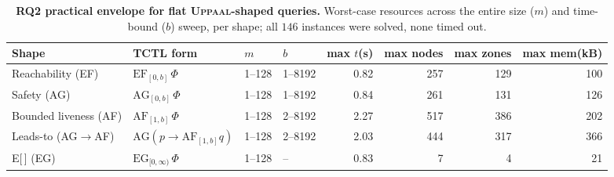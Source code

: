 \begin{table}[t]\centering
\caption{\textbf{RQ2 practical envelope for flat \textsc{Uppaal}-shaped queries.} Worst-case resources across the entire size ($m$) and time-bound ($b$) sweep, per shape; all $146$ instances were solved, none timed out.}\label{tab:perf-rq2}
\small\setlength{\tabcolsep}{5pt}
\begin{tabular}{llllrrrr}
\toprule
Shape & TCTL form & $m$ & $b$ & max $t$(s) & max nodes & max zones & max mem(kB) \\
\midrule
Reachability (EF) & $\mathrm{EF}_{[0,b]}\,\Phi$ & 1--128 & 1--8192 & 0.82 & 257 & 129 & 100 \\
Safety (AG) & $\mathrm{AG}_{[0,b]}\,\Phi$ & 1--128 & 1--8192 & 0.84 & 261 & 131 & 126 \\
Bounded liveness (AF) & $\mathrm{AF}_{[1,b]}\,\Phi$ & 1--128 & 2--8192 & 2.27 & 517 & 386 & 202 \\
Leads-to (AG$\to$AF) & $\mathrm{AG}(p\!\to\!\mathrm{AF}_{[1,b]}q)$ & 1--128 & 2--8192 & 2.03 & 444 & 317 & 366 \\
E[\,] (EG) & $\mathrm{EG}_{[0,\infty)}\,\Phi$ & 1--128 & -- & 0.83 & 7 & 4 & 21 \\
\bottomrule
\end{tabular}
\end{table}
